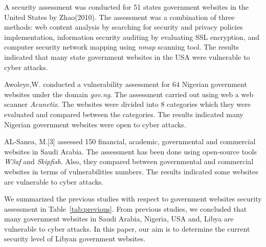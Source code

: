 \documentclass[conference]{IEEEtran}
\begin{document}
A security assessment was conducted for 51 states government websites in the
United States by Zhao(2010)\cite{zhao2010opportunities}. The assessment was a
combination of three methods: web content analysis by searching for security and
privacy policies implementation, information security auditing by evaluating SSL
encryption, and computer security network mapping using \emph{nmap} scanning
tool. The results indicated that many state government websites in the USA were
vulnerable to cyber attacks.

Awoleye,W.\cite{awoleye2012technological}\cite{awoleye2014web} conducted a
vulnerability assessment for 64 Nigerian government websites under the domain
\emph{gov.ng}. The assessment carried out using web a web scanner
\emph{Acunetix}. The websites were divided into 8 categories which they were
evaluated and compared between the categories. The results indicated many
Nigerian government websites were open to cyber attacks.

AL-Sanea, M.[3] assessed 150 financial, academic, governmental and commercial
websites in Saudi Arabia. The assessment has been done using open-source tools
\emph{W3af} and \emph{Skipfish}. Also, they compared between governmental and
commercial websites in terms of vulnerabilities numbers. The results indicated
some websites are vulnerable to cyber attacks.

We summarized the previous studies with respect to government websites security
assessment in Table~\ref{tab:previous}. From previous studies, we concluded that
many government websites in Saudi Arabia, Nigeria, USA and, Libya are vulnerable
to cyber attacks. In this paper, our aim is to determine the current security
level of Libyan government websites.
\end{document}
